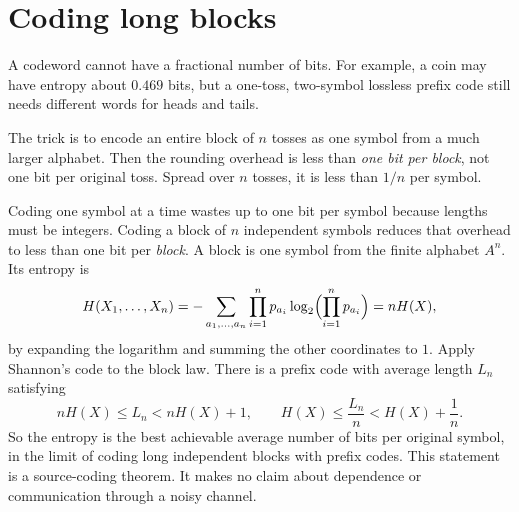 \section{Coding long blocks}

A codeword cannot have a fractional number of bits. For example, a coin may have entropy about $0.469$ bits, but a one-toss, two-symbol lossless prefix code still needs different words for heads and tails.

The trick is to encode an entire block of $n$ tosses as one symbol from a much larger alphabet. Then the rounding overhead is less than \emph{one bit per block}, not one bit per original toss. Spread over $n$ tosses, it is less than $1/n$ per symbol.

Coding one symbol at a time wastes up to one bit per symbol because lengths must be integers. Coding a block of $n$ independent symbols reduces that overhead to less than one bit per \emph{block}. A block is one symbol from the finite alphabet $A^n$. Its entropy is
\[
H(X_1,\ldots,X_n)=-\sum_{a_1,\ldots,a_n}\prod_{i=1}^np_{a_i}
  \log_2\Bigl(\prod_{i=1}^np_{a_i}\Bigr)
=nH(X),
\]
by expanding the logarithm and summing the other coordinates to $1$. Apply Shannon's code to the block law. There is a prefix code with average length $L_n$ satisfying
\[
nH(X)\le L_n<nH(X)+1,
\qquad H(X)\le\frac{L_n}{n}<H(X)+\frac1n.
\]
So the entropy is the best achievable average number of bits per original symbol, in the limit of coding long independent blocks with prefix codes. This statement is a source-coding theorem. It makes no claim about dependence or communication through a noisy channel.

